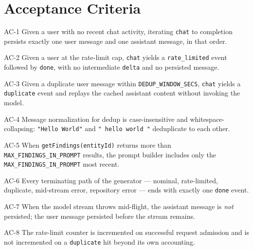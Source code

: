 \section{Acceptance Criteria}

\begin{ac}{AC-1}
Given a user with no recent chat activity, iterating \texttt{chat} to completion persists exactly one user message and one assistant message, in that order.
\end{ac}

\begin{ac}{AC-2}
Given a user at the rate-limit cap, \texttt{chat} yields a \texttt{rate\_limited} event followed by \texttt{done}, with no intermediate \texttt{delta} and no persisted message.
\end{ac}

\begin{ac}{AC-3}
Given a duplicate user message within \texttt{DEDUP\_WINDOW\_SECS}, \texttt{chat} yields a \texttt{duplicate} event and replays the cached assistant content without invoking the model.
\end{ac}

\begin{ac}{AC-4}
Message normalization for dedup is case-insensitive and whitespace-collapsing: \texttt{"Hello World"} and \texttt{"  hello  world  "} deduplicate to each other.
\end{ac}

\begin{ac}{AC-5}
When \texttt{getFindings(entityId)} returns more than \texttt{MAX\_FINDINGS\_IN\_PROMPT} results, the prompt builder includes only the \texttt{MAX\_FINDINGS\_IN\_PROMPT} most recent.
\end{ac}

\begin{ac}{AC-6}
Every terminating path of the generator --- nominal, rate-limited, duplicate, mid-stream error, repository error --- ends with exactly one \texttt{done} event.
\end{ac}

\begin{ac}{AC-7}
When the model stream throws mid-flight, the assistant message is \emph{not} persisted; the user message persisted before the stream remains.
\end{ac}

\begin{ac}{AC-8}
The rate-limit counter is incremented on successful request admission and is not incremented on a \texttt{duplicate} hit beyond its own accounting.
\end{ac}

